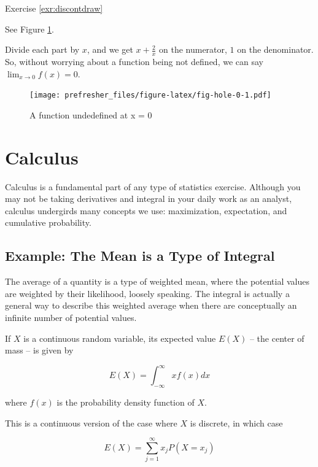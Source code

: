 \documentclass[]{book}
\theoremstyle{definition}
\theoremstyle{definition}
\theoremstyle{definition}
\theoremstyle{remark}
\let\BeginKnitrBlock\begin \let\EndKnitrBlock\end
\begin{document}
Exercise \ref{exr:discontdraw}

\BeginKnitrBlock{solution}
{}
See Figure \ref{fig:fig-hole-0}.

Divide each part by \(x\), and we get \(x + \frac{2}{x}\) on the numerator, \(1\) on the denominator. So, without worrying about a function being not defined, we can say \(\lim_{x\to 0}f(x) = 0\).
\EndKnitrBlock{solution}

\begin{figure}
\centering
\texttt{[image: prefresher\_files/figure-latex/fig-hole-0-1.pdf]}
\caption{\label{fig:fig-hole-0}A function undedefined at x = 0}
\end{figure}

\hypertarget{derivatives}{%
\chapter{Calculus}\label{derivatives}}

Calculus is a fundamental part of any type of statistics exercise. Although you may not be taking derivatives and integral in your daily work as an analyst, calculus undergirds many concepts we use: maximization, expectation, and cumulative probability.

\hypertarget{example-the-mean-is-a-type-of-integral}{%
\section*{Example: The Mean is a Type of Integral}\label{example-the-mean-is-a-type-of-integral}}

The average of a quantity is a type of weighted mean, where the potential values are weighted by their likelihood, loosely speaking. The integral is actually a general way to describe this weighted average when there are conceptually an infinite number of potential values.

If \(X\) is a continuous random variable, its expected value \(E(X)\) -- the center of mass -- is given by

\[E(X) = \int^{\infty}_{-\infty}x f(x) dx\]

where \(f(x)\) is the probability density function of \(X\).

This is a continuous version of the case where \(X\) is discrete, in which case

\[E(X) = \sum^\infty_{j=1} x_j P(X = x_j)\]
\end{document}
